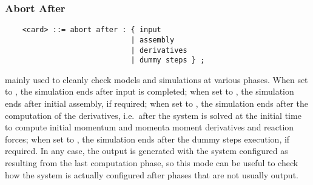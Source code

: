 \subsubsection{Abort After}
\label{sec:IVP:abort after}
\begin{verbatim}
    <card> ::= abort after : { input 
                             | assembly 
                             | derivatives 
                             | dummy steps } ;
\end{verbatim}
mainly used to cleanly check models and simulations at various phases.
When set to , the simulation ends after input is completed;
when set to , the simulation ends after initial assembly,
if required;
when set to , the simulation ends after the computation
of the derivatives, i.e.\ after the system is solved at the initial
time to compute initial momentum and momenta moment derivatives and 
reaction forces;
when set to , the simulation ends after the dummy steps
execution, if required.
In any case, the output is generated with the system configured 
as resulting from the last computation phase, so this mode can be useful 
to check how the system is actually configured after phases that are not 
usually output.


